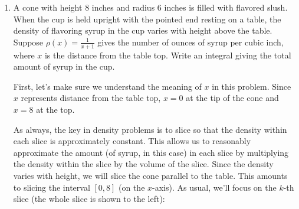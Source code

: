 \documentclass[main]{subfiles}
\begin{document}
\begin{enumerate}
\begin{enumerate}
  \end{enumerate}

\pspace{\newpage}

\item 

  \begin{problem}[\vfill]
    A cone with height $8$ inches and radius $6$ inches is filled with
    flavored slush. When the cup is held upright with the pointed end
    resting on a table, the density of flavoring syrup in the cup varies
    with height above the table.  Suppose $\rho(x) = \frac{1}{x + 1}$
    gives the number of ounces of syrup per cubic inch, where $x$ is the
    distance from the table top.  Write an integral giving the total
    amount of syrup in the cup.
  \end{problem}

  \begin{solution}
    First, let's make sure we understand the meaning of $x$ in this
    problem.  Since $x$ represents distance from the table top, $x = 0$ at
    the tip of the cone and $x = 8$ at the top.

    As always, the key in density problems is to slice so that the density
    within each slice is approximately constant.  This allows us to
    reasonably approximate the amount (of syrup, in this case) in each
    slice by multiplying the density within the slice by the volume of the
    slice.  Since the density varies with height, we will slice the cone
    parallel to the table.  This amounts to slicing the interval $[0, 8]$
    (on the $x$-axis).  As usual, we'll focus on the $k$-th slice (the
    whole slice is shown to the left):
    \begin{center}
      \begin{tikzpicture}[x=0.5cm, y=0.5cm]


\end{tikzpicture}
\end{center}
\end{solution}
\end{enumerate}
\end{document}
